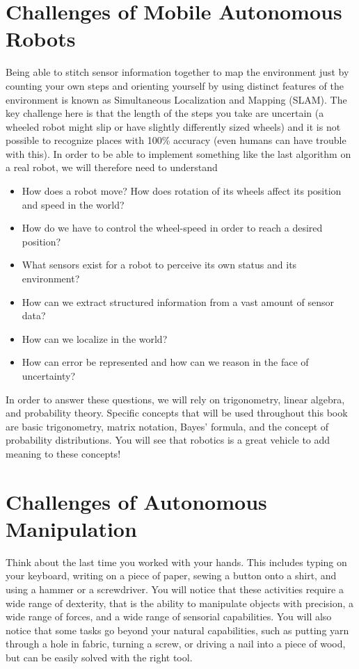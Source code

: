 \section{Challenges of Mobile Autonomous Robots}

Being able to stitch sensor information together to map the environment just by counting your own steps and orienting yourself by using distinct features of the environment is known as Simultaneous Localization and Mapping (SLAM). The key challenge here is that the length of the steps you take are uncertain (a wheeled robot might slip or have slightly differently sized wheels) and it is not possible to recognize places with 100\% accuracy (even humans can have trouble with this). In order to be able to implement something like the last algorithm on a real robot, we will therefore need to understand

\begin{itemize}
\item How does a robot move? How does rotation of its wheels affect its position and speed in the world?
\item How do we have to control the wheel-speed in order to reach a desired position?
\item What sensors exist for a robot to perceive its own status and its environment?
\item How can we extract structured information from a vast amount of sensor data?
\item How can we localize in the world?
\item How can error be represented and how can we reason in the face of uncertainty?
\end{itemize}

In order to answer these questions, we will rely on trigonometry, linear algebra, and probability theory. Specific concepts that will be used throughout this book are basic trigonometry, matrix notation, Bayes' formula, and the concept of probability distributions. You will see that robotics is a great vehicle to add meaning to these concepts!


\section{Challenges of Autonomous Manipulation}
Think about the last time you worked with your hands. This includes typing on your keyboard, writing on a piece of paper, sewing a button onto a shirt, and using a hammer or a screwdriver. You will notice that these activities require a wide range of dexterity, that is the ability to manipulate objects with precision, a wide range of forces, and a wide range of sensorial capabilities. You will also notice that some tasks go beyond your natural capabilities, such as putting yarn through a hole in fabric, turning a screw, or driving a nail into a piece of wood, but can be easily solved with the right tool.

